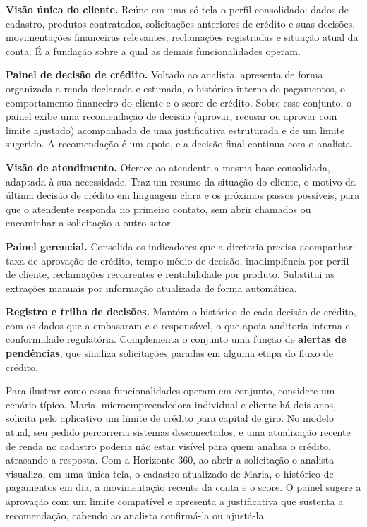 \documentclass[12pt,a4paper]{article}
\begin{document}
\textbf{Vis\~ao \'unica do cliente.} Re\'une em uma s\'o tela o perfil consolidado: dados de cadastro, produtos contratados, solicita\c{c}\~oes anteriores de cr\'edito e suas decis\~oes, movimenta\c{c}\~oes financeiras relevantes, reclama\c{c}\~oes registradas e situa\c{c}\~ao atual da conta. \'E a funda\c{c}\~ao sobre a qual as demais funcionalidades operam.

\textbf{Painel de decis\~ao de cr\'edito.} Voltado ao analista, apresenta de forma organizada a renda declarada e estimada, o hist\'orico interno de pagamentos, o comportamento financeiro do cliente e o score de cr\'edito. Sobre esse conjunto, o painel exibe uma recomenda\c{c}\~ao de decis\~ao (aprovar, recusar ou aprovar com limite ajustado) acompanhada de uma justificativa estruturada e de um limite sugerido. A recomenda\c{c}\~ao \'e um apoio, e a decis\~ao final continua com o analista.

\textbf{Vis\~ao de atendimento.} Oferece ao atendente a mesma base consolidada, adaptada \`a sua necessidade. Traz um resumo da situa\c{c}\~ao do cliente, o motivo da \'ultima decis\~ao de cr\'edito em linguagem clara e os pr\'oximos passos poss\'iveis, para que o atendente responda no primeiro contato, sem abrir chamados ou encaminhar a solicita\c{c}\~ao a outro setor.

\textbf{Painel gerencial.} Consolida os indicadores que a diretoria precisa acompanhar: taxa de aprova\c{c}\~ao de cr\'edito, tempo m\'edio de decis\~ao, inadimpl\^encia por perfil de cliente, reclama\c{c}\~oes recorrentes e rentabilidade por produto. Substitui as extra\c{c}\~oes manuais por informa\c{c}\~ao atualizada de forma autom\'atica.

\textbf{Registro e trilha de decis\~oes.} Mant\'em o hist\'orico de cada decis\~ao de cr\'edito, com os dados que a embasaram e o respons\'avel, o que apoia auditoria interna e conformidade regulat\'oria. Complementa o conjunto uma fun\c{c}\~ao de \textbf{alertas de pend\^encias}, que sinaliza solicita\c{c}\~oes paradas em alguma etapa do fluxo de cr\'edito.

Para ilustrar como essas funcionalidades operam em conjunto, considere um cen\'ario t\'ipico. Maria, microempreendedora individual e cliente h\'a dois anos, solicita pelo aplicativo um limite de cr\'edito para capital de giro. No modelo atual, seu pedido percorreria sistemas desconectados, e uma atualiza\c{c}\~ao recente de renda no cadastro poderia n\~ao estar vis\'ivel para quem analisa o cr\'edito, atrasando a resposta. Com a Horizonte 360, ao abrir a solicita\c{c}\~ao o analista visualiza, em uma \'unica tela, o cadastro atualizado de Maria, o hist\'orico de pagamentos em dia, a movimenta\c{c}\~ao recente da conta e o score. O painel sugere a aprova\c{c}\~ao com um limite compat\'ivel e apresenta a justificativa que sustenta a recomenda\c{c}\~ao, cabendo ao analista confirm\'a-la ou ajust\'a-la.
\end{document}
